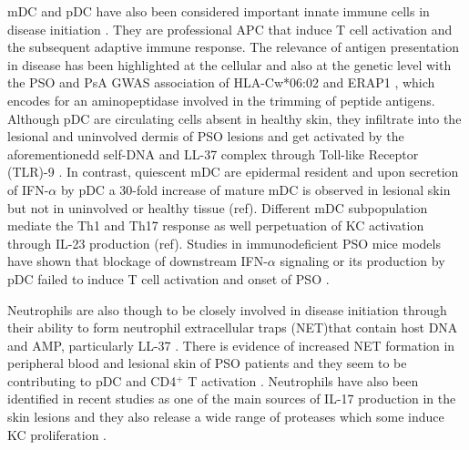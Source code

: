mDC and pDC have also been considered important innate immune cells in disease initiation \parencite{Mahil20016}. They are professional APC that induce T cell activation and the subsequent adaptive immune response. The relevance of antigen presentation in disease has been highlighted at the cellular \parencite{Rusell1972, Tiilikainen1980} and also at the genetic level with the PSO and PsA GWAS association of HLA-Cw*06:02 and ERAP1 \parencite{Strange2010}, which encodes for an aminopeptidase involved in the trimming of peptide antigens. Although pDC are circulating cells absent in healthy skin, they infiltrate into the lesional and uninvolved dermis of PSO lesions \parencite{Nestle2005} and get activated by the aforementionedd self-DNA and LL-37 complex through Toll-like Receptor (TLR)-9 \parencite{Lande2007}. In contrast, quiescent mDC are epidermal resident and upon secretion of IFN-$\alpha$ by pDC a 30-fold increase of mature mDC is observed in lesional skin but not in uninvolved or healthy tissue (ref). Different mDC subpopulation mediate the Th1 and Th17 response as well perpetuation of KC activation through IL-23 production (ref). Studies in immunodeficient PSO mice models have shown that blockage of downstream  IFN-$\alpha$ signaling or its production by pDC failed to induce T cell activation and onset of PSO \parencite{Nestle2005}. 

Neutrophils are also though to be closely involved in disease initiation through their ability to form neutrophil extracellular traps (NET)that contain host DNA and AMP, particularly LL-37 \parencite{Hu2016}. There is evidence of increased NET formation in peripheral blood and lesional skin of PSO patients and they seem to be contributing to pDC and CD4$^+$ T activation \parencite{Hu2016}. Neutrophils have also been identified in recent studies as one of the main sources of IL-17 production in the skin lesions \parencite{Lin2011} and they also release a wide range of proteases which some induce KC proliferation \parencite{Mahil2006}.

